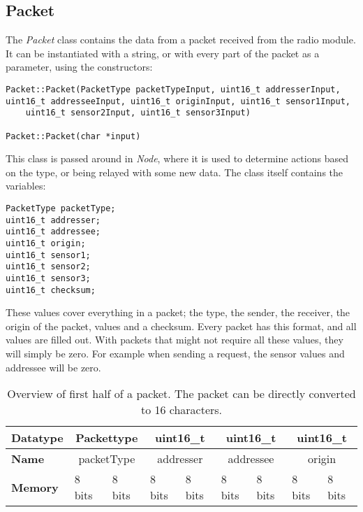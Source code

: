 \subsection{Packet}
The \textit{Packet} class contains the data from a packet received from the radio module. It can be instantiated with a string, or with every part of the packet as a parameter, using the constructors:
\begin{lstlisting}
Packet::Packet(PacketType packetTypeInput, uint16_t addresserInput, uint16_t addresseeInput, uint16_t originInput, uint16_t sensor1Input,
	uint16_t sensor2Input, uint16_t sensor3Input)
	
Packet::Packet(char *input)
\end{lstlisting}


This class is passed around in \textit{Node}, where it is used to determine actions based on the type, or being relayed with some new data. 
The class itself contains the variables:
\begin{lstlisting}
PacketType packetType;
uint16_t addresser;
uint16_t addressee;
uint16_t origin;
uint16_t sensor1;
uint16_t sensor2;
uint16_t sensor3;
uint16_t checksum;
\end{lstlisting}
These values cover everything in a packet; the type, the sender, the receiver, the origin of the packet, values and a checksum.
Every packet has this format, and all values are filled out. With packets that might not require all these values, they will simply be zero. For example when sending a request, the sensor values and addressee will be zero.

\begin{table}[]
\centering
\begin{tabular}{|l|c|l|c|l|c|l|c|l|}
\hline
\textbf{Datatype} & \multicolumn{2}{c|}{Packettype}      & \multicolumn{2}{c|}{uint16\_t}       & \multicolumn{2}{c|}{uint16\_t}       & \multicolumn{2}{c|}{uint16\_t}       \\ \hline
\textbf{Name}     & \multicolumn{2}{c|}{packetType}      & \multicolumn{2}{c|}{addresser}       & \multicolumn{2}{c|}{addressee}       & \multicolumn{2}{c|}{origin}          \\ \hline
\textbf{Memory}   & \multicolumn{1}{l|}{8 bits} & 8 bits & \multicolumn{1}{l|}{8 bits} & 8 bits & \multicolumn{1}{l|}{8 bits} & 8 bits & \multicolumn{1}{l|}{8 bits} & 8 bits \\ \hline
\end{tabular}
\caption{Overview of first half of a packet. The packet can be directly converted to 16 characters.}
\label{tab:packetTableFirst}
\end{table}

